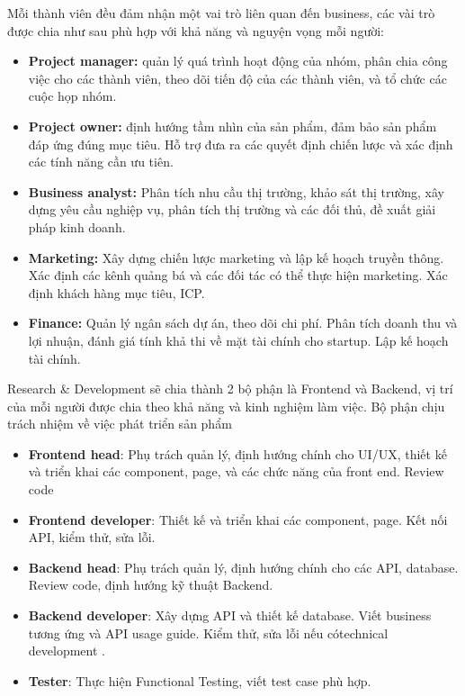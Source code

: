 Mỗi thành viên đều đảm nhận một vai trò liên quan đến business, các vài trò được chia như sau phù hợp với khả năng và nguyện vọng mỗi người:

\begin{itemize}

  \item \textbf{Project manager:} quản lý quá trình hoạt động của nhóm, phân chia công việc cho các thành viên, theo dõi tiến độ của các thành viên, và tổ chức các cuộc họp nhóm.
  \item \textbf{Project owner:} định hướng tầm nhìn của sản phẩm, đảm bảo sản phẩm đáp ứng đúng mục tiêu. Hỗ trợ đưa ra các quyết định chiến lược và xác định các tính năng cần ưu tiên.
  \item \textbf{Business analyst:} Phân tích nhu cầu thị trường, khảo sát thị trường, xây dựng yêu cầu nghiệp vụ, phân tích thị trường và các đối thủ, đề xuất giải pháp kinh doanh.
  \item \textbf{Marketing:} Xây dựng chiến lược marketing và lập kế hoạch truyền thông. Xác định các kênh quảng bá và các đối tác có thể thực hiện marketing. Xác định khách hàng mục tiêu, ICP.
  \item \textbf{Finance:} Quản lý ngân sách dự án, theo dõi chi phí. Phân tích doanh thu và lợi nhuận, đánh giá tính khả thi về mặt tài chính cho startup. Lập kế hoạch tài chính.
\end{itemize}

Research \& Development sẽ chia thành 2 bộ phận là Frontend và Backend, vị trí của mỗi người được chia theo khả năng và kinh nghiệm làm việc. Bộ phận chịu trách nhiệm về việc phát triển sản phẩm

\begin{itemize}
  \item \textbf{Frontend head}: Phụ trách quản lý, định hướng chính cho UI/UX, thiết kế và triển khai các component, page, và các chức năng của front end. Review code
  \item \textbf{Frontend developer}: Thiết kế và triển khai các component, page. Kết nối API, kiểm thử, sửa lỗi. 
  \item \textbf{Backend head}: Phụ trách quản lý, định hướng chính cho các API, database. Review code, định hướng kỹ thuật Backend. 
  \item \textbf{Backend developer}: Xây dựng API và thiết kế database. Viết business tương ứng và API usage guide. Kiểm thử, sửa lỗi nếu cótechnical development .
  \item \textbf{Tester}: Thực hiện Functional Testing, viết test case phù hợp.
\end{itemize}

